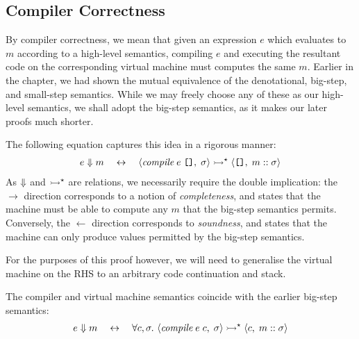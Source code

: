 
\subsection{Compiler Correctness}%

By compiler correctness, we mean that given an expression $e$ which
evaluates to $m$ according to a high-level semantics, compiling $e$ and
executing the resultant code on the corresponding virtual machine must
computes the same $m$. Earlier in the chapter, we had shown the mutual
equivalence of the denotational, big-step, and small-step semantics. While
we may freely choose any of these as our high-level semantics, we shall
adopt the big-step semantics, as it makes our later proofs much shorter.

The following equation captures this idea in a rigorous manner:
\begin{gather*}
	e \Eval m
	\quad\leftrightarrow\quad
	\MS<\compile\;e\;\nil, \sigma>
		\ExecS \MS<\nil, m :: \sigma>
\end{gather*}
As $\Downarrow$ and $\rightarrowtail^\star$ are relations, we necessarily
require the double implication: the $\rightarrow$ direction corresponds to
a notion of \emph{completeness}, and states that the machine must be able to
compute any $m$ that the big-step semantics permits. Conversely, the
$\leftarrow$ direction corresponds to \emph{soundness}, and states that the
machine can only produce values permitted by the big-step semantics.

For the purposes of this proof however, we will need to generalise the
virtual machine on the RHS to an arbitrary code continuation and stack.
\begin{theorem}\label{thm:compiler-correct}
The compiler and virtual machine semantics coincide with the earlier
big-step semantics:
\begin{gather*}
	e \Eval m
	\quad\leftrightarrow\quad
	\forall c, \sigma.\
		\MS<\compile\;e\;c, \sigma>
			\ExecS \MS<c, m :: \sigma>
\end{gather*}
\end{theorem}

